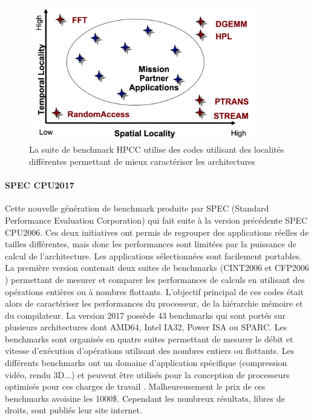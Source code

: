             \begin{figure}
                \center
                \includegraphics[width=10cm]{images/bench_hpcc.png}
                \caption{ La suite de benchmark HPCC utilise des codes utilisant des localités différentes permettant de mieux caractériser les architectures
                \label{pic_bench_hpcc}}
            \end{figure}
        
        
        \paragraph{SPEC CPU2017 \cite{Bucek2018}} 
        
            Cette nouvelle génération de benchmark produite par SPEC (Standard Performance Evaluation Corporation) qui fait suite à la version précédente SPEC CPU2006. Ces deux initiatives ont permis de regrouper des applications réelles de tailles différentes, mais donc les performances sont limitées par la puissance de calcul de l'architecture. Les applications sélectionnées sont facilement portables. La première version contenait deux suites de benchmarks (CINT2006 \cite{Dilipbhai2012} et CFP2006 \cite{Sharkawi2009}) permettant de mesurer et comparer les performances de calculs en utilisant des opérations entières ou à nombres flottants. L'objectif principal de ces codes était alors de caractériser les performances du processeur, de la hiérarchie mémoire et du compilateur. La version 2017 possède 43 benchmarks qui sont portés sur plusieurs architectures dont AMD64, Intel IA32, Power ISA ou SPARC. Les benchmarks sont organisés en quatre suites permettant de mesurer le débit et vitesse d'exécution d'opérations utilisant des nombres entiers ou flottants.  Les différents benchmarks ont un domaine d'application spécifique (compression vidéo, rendu 3D...) et peuvent être utilisés pour la conception de processeurs optimisés pour ces charges de travail \cite{Panda2018}. Malheureusement le prix de ces benchmarks avoisine les 1000\$. Cependant les nombreux résultats, libres de droits, sont publiés leur site internet. 
        
